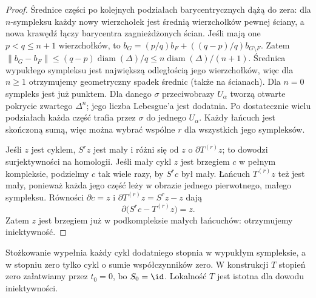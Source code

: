 \begin{proof}
Średnice części po kolejnych podziałach
barycentrycznych dążą do zera: dla
$n$-sympleksu każdy nowy wierzchołek
jest średnią wierzchołków pewnej ściany,
a nowa krawędź łączy barycentra zagnieżdżonych ścian.
Jeśli mają one $p<q\leq n+1$ wierzchołków, to
$b_G=(p/q)b_F+((q-p)/q)b_{G\setminus F}$.
Zatem $\|b_G-b_F\|\leq(q-p)\operatorname{diam}(\Delta)/q
\leq n\operatorname{diam}(\Delta)/(n+1)$.
Średnica wypukłego sympleksu jest największą odległością jego
wierzchołków, więc dla $n\geq1$ otrzymujemy geometryczny spadek
średnic (także na ścianach). Dla $n=0$ sympleks jest już punktem. Dla danego $\sigma$
przeciwobrazy $U_\alpha$ tworzą
otwarte pokrycie zwartego $\Delta^n$;
jego liczba Lebesgue'a jest dodatnia.
Po dostatecznie wielu podziałach
każda część trafia przez $\sigma$
do jednego $U_\alpha$.
Każdy łańcuch jest skończoną sumą,
więc można wybrać wspólne $r$
dla wszystkich jego sympleksów.

Jeśli $z$ jest cyklem, $S^rz$
jest mały i różni się od $z$
o $\partial T^{(r)}z$; to dowodzi
surjektywności na homologii.
Jeśli mały cykl $z$ jest brzegiem
$c$ w pełnym kompleksie, podzielmy
$c$ tak wiele razy, by $S^rc$
był mały. Łańcuch $T^{(r)}z$
też jest mały, ponieważ każda
jego część leży w obrazie
jednego pierwotnego, małego sympleksu.
Równości $\partial c=z$ i
$\partial T^{(r)}z=S^rz-z$ dają
\[
 \partial\bigl(S^rc-T^{(r)}z\bigr)=z.
\]
Zatem $z$ jest brzegiem już
w podkompleksie małych łańcuchów:
otrzymujemy iniektywność.
\end{proof}

Stożkowanie wypełnia każdy cykl dodatniego stopnia w wypukłym
sympleksie, a w stopniu zero tylko cykl o sumie współczynników zero.
W konstrukcji $T$ stopień zero załatwiamy przez $t_0=0$,
bo $S_0=\id$. Lokalność $T$ jest istotna dla dowodu iniektywności.

